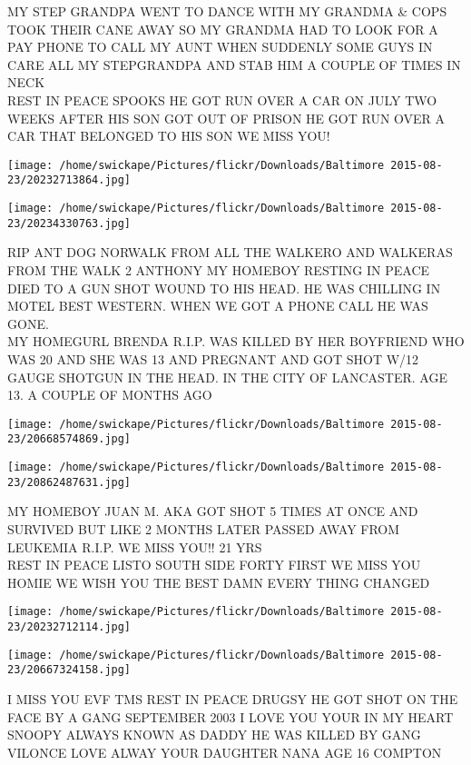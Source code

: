 \documentclass[10pt,letterpaper]{article}
\begin{document}
MY STEP GRANDPA WENT TO DANCE WITH MY GRANDMA \& COPS TOOK THEIR CANE AWAY SO MY GRANDMA HAD TO LOOK FOR A PAY PHONE TO CALL MY AUNT WHEN SUDDENLY SOME GUYS IN CARE ALL MY STEPGRANDPA AND STAB HIM A COUPLE OF TIMES IN NECK\\
REST IN PEACE SPOOKS HE GOT RUN OVER A CAR ON JULY TWO WEEKS AFTER HIS SON GOT OUT OF PRISON HE GOT RUN OVER A CAR THAT BELONGED TO HIS SON WE MISS YOU!\\
\pagebreak

\texttt{[image: /home/swickape/Pictures/flickr/Downloads/Baltimore 2015-08-23/20232713864.jpg]}

\vspace{0.25in}
\texttt{[image: /home/swickape/Pictures/flickr/Downloads/Baltimore 2015-08-23/20234330763.jpg]}

RIP ANT DOG NORWALK FROM ALL THE WALKERO AND WALKERAS FROM THE WALK  2 ANTHONY MY HOMEBOY RESTING IN PEACE DIED TO A GUN SHOT WOUND TO HIS HEAD.  HE WAS CHILLING IN MOTEL BEST WESTERN.  WHEN WE GOT A PHONE CALL HE WAS GONE.\\
MY HOMEGURL BRENDA R.I.P. WAS KILLED BY HER BOYFRIEND WHO WAS 20 AND SHE WAS 13 AND PREGNANT AND GOT SHOT W/12 GAUGE SHOTGUN IN THE HEAD.  IN THE CITY OF LANCASTER.  AGE 13.  A COUPLE OF MONTHS AGO\\
\pagebreak

\texttt{[image: /home/swickape/Pictures/flickr/Downloads/Baltimore 2015-08-23/20668574869.jpg]}

\vspace{0.25in}
\texttt{[image: /home/swickape/Pictures/flickr/Downloads/Baltimore 2015-08-23/20862487631.jpg]}

MY HOMEBOY JUAN M. AKA GOT SHOT 5 TIMES AT ONCE AND SURVIVED BUT LIKE 2 MONTHS LATER PASSED AWAY FROM LEUKEMIA R.I.P. WE MISS YOU!!  21 YRS\\
REST IN PEACE LISTO SOUTH SIDE FORTY FIRST WE MISS YOU HOMIE WE WISH YOU THE BEST DAMN EVERY THING CHANGED\\
\pagebreak

\texttt{[image: /home/swickape/Pictures/flickr/Downloads/Baltimore 2015-08-23/20232712114.jpg]}

\vspace{0.25in}
\texttt{[image: /home/swickape/Pictures/flickr/Downloads/Baltimore 2015-08-23/20667324158.jpg]}

I MISS YOU EVF TMS REST IN PEACE DRUGSY HE GOT SHOT ON THE FACE BY A GANG SEPTEMBER 2003 I LOVE YOU YOUR IN MY HEART\\
SNOOPY ALWAYS KNOWN AS DADDY HE WAS KILLED BY GANG VILONCE LOVE ALWAY YOUR DAUGHTER NANA AGE 16 COMPTON\\
\pagebreak
\end{document}
